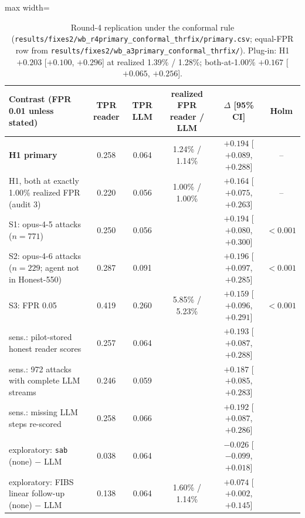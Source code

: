 \documentclass[11pt]{article}
\begin{document}
\begin{table}[!htbp]\centering\small
\begin{adjustbox}{max width=\linewidth}\begin{tabular}{@{}lccccc@{}}
\toprule
Contrast (FPR 0.01 unless stated) & TPR reader & TPR LLM & realized FPR reader / LLM & $\Delta$ [95\% CI] & Holm\\
\midrule
\textbf{H1 primary} & 0.258 & 0.064 & 1.24\% / 1.14\% & $\mathbf{+0.194}$ [$+0.089$, $+0.288$] & --\\
H1, both at exactly 1.00\% realized FPR (audit 3) & 0.220 & 0.056 & 1.00\% / 1.00\% & $+0.164$ [$+0.075$, $+0.263$] & --\\
S1: opus-4-5 attacks ($n=771$) & 0.250 & 0.056 & & $+0.194$ [$+0.080$, $+0.300$] & $<0.001$\\
S2: opus-4-6 attacks ($n=229$; agent not in Honest-550) & 0.287 & 0.091 & & $+0.196$ [$+0.097$, $+0.285$] & $<0.001$\\
S3: FPR 0.05 & 0.419 & 0.260 & 5.85\% / 5.23\% & $+0.159$ [$+0.096$, $+0.291$] & $<0.001$\\
\midrule
sens.: pilot-stored honest reader scores & 0.257 & 0.064 & & $+0.193$ [$+0.087$, $+0.288$] & \\
sens.: 972 attacks with complete LLM streams & 0.246 & 0.059 & & $+0.187$ [$+0.085$, $+0.283$] & \\
sens.: missing LLM steps re-scored & 0.258 & 0.066 & & $+0.192$ [$+0.087$, $+0.286$] & \\
exploratory: \texttt{sab} (none) $-$ LLM & 0.038 & 0.064 & & $-0.026$ [$-0.099$, $+0.018$] & \\
exploratory: FIBS linear follow-up (none) $-$ LLM & 0.138 & 0.064 & 1.60\% / 1.14\% & $+0.074$ [$+0.002$, $+0.145$] & \\
\bottomrule
\end{tabular}\end{adjustbox}
\caption{Round-4 replication under the conformal rule (\nolinkurl{results/fixes2/wb_r4primary_conformal_thrfix/primary.csv}; equal-FPR row from \nolinkurl{results/fixes2/wb_a3primary_conformal_thrfix/}). Plug-in: H1 $+0.203$ [$+0.100$, $+0.296$] at realized 1.39\% / 1.28\%; both-at-1.00\% $+0.167$ [$+0.065$, $+0.256$].}\label{tab:r4primary}
\end{table}
\end{document}
